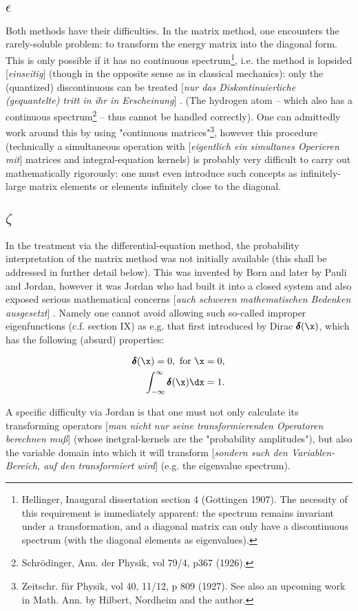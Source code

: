 \documentclass{article}
\newcommand{\WTF}[1]{
[\it{\small{#1}}]
}
\newcommand{\uequ}[1]{
\begin{align*}
#1
\end{align*}
}
\newcommand{\func}[1]{\pmb{#1}}
\renewcommand{\it}[1]{\textit{#1}}
\newcommand{\intXY}[2]{\int_{#1}^{#2}}
\newcommand{\ddelta}{\func{\delta}}
\begin{document}
\subsection*{$\epsilon$}
Both methods have their difficulties. In the matrix method, one encounters the rarely-soluble problem: to transform the energy matrix into the diagonal form. This is only possible if it has no continuous spectrum\footnote{Hellinger, Inaugural dissertation section 4 (Gottingen 1907). The necessity of this requirement is immediately apparent: the spectrum remains invariant under a transformation, and a diagonal matrix can only have a discontinuous spectrum (with the diagonal elements as eigenvalues).}, i.e. the method is lopsided\WTF{einseitig} (though in the opposite sense as in classical mechanics): only the (quantized) discontinuous can be treated\WTF{nur das Diskontinuierliche (gequantelte) tritt in ihr in Erscheinung}. (The hydrogen atom -- which also has a continuous spectrum\footnote{Schrödinger, Ann. der Physik, vol 79/4, p367 (1926).} -- thus cannot be handled correctly). One can admittedly work around this by using "continuous matrices"\footnote{Zeitschr. für Physik, vol 40, 11/12, p 809 (1927). See also an upcoming work in Math. Ann. by Hilbert, Nordheim and the author.}, however this procedure (technically a simultaneous operation with\WTF{eigentlich ein simultanes Operieren mit} matrices and integral-equation kernels) is probably very difficult to carry out mathematically rigorously: one must even introduce such concepts as infinitely-large matrix elements or elements infinitely close to the diagonal.
\subsection*{$\zeta$}
In the treatment via the differential-equation method, the probability interpretation of the matrix method was not initially available (this shall be addressed in further detail below). This was invented by Born and later by Pauli and Jordan, however it was Jordan who had built it into a closed system and also exposed serious mathematical concerns\WTF{auch schweren mathematischen Bedenken ausgesetzt}. Namely one cannot avoid allowing such so-called improper eigenfunctions (c.f. section IX) as e.g. that first introduced by Dirac $\ddelta(\x)$, which has the following (absurd) properties:
\uequ{
\ddelta(\x)=0, \text{ for } \x = 0,\\
\intXY{-\infty}{\infty}\ddelta(\x)\dx = 1.
}
A specific difficulty via Jordan is that one must not only calculate its transforming operators\WTF{man nicht nur seine transformierenden Operatoren berechnen muß} (whose inetgral-kernels are the "probability amplitudes"), but also the variable domain into which it will transform\WTF{sondern such den Variablen-Bereich, auf den transformiert wird} (e.g. the eigenvalue spectrum).
\end{document}
